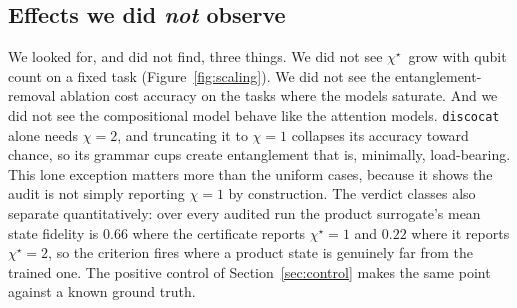 \documentclass[10pt]{article}
\newcommand{\chistar}{\ensuremath{\chi^\star}}
\begin{document}
\subsection{Effects we did \emph{not} observe}
\label{sec:results-none}
We looked for, and did not find, three things. We did not see \chistar\ grow with qubit count on a
fixed task (Figure~\ref{fig:scaling}). We did not see the entanglement-removal ablation cost accuracy
on the tasks where the models saturate. And we did not see the compositional model behave like the
attention models. \texttt{discocat} alone needs $\chi{=}2$, and truncating it to $\chi{=}1$ collapses
its accuracy toward chance, so its grammar cups create entanglement that is, minimally, load-bearing.
This lone exception matters more than the uniform cases, because it shows the audit is not simply
reporting $\chi{=}1$ by construction. The verdict classes also separate quantitatively: over every
audited run the product surrogate's mean state fidelity is $0.66$ where the certificate reports
$\chi^\star{=}1$ and $0.22$ where it reports $\chi^\star{=}2$, so the criterion fires where a
product state is genuinely far from the trained one. The positive control of
Section~\ref{sec:control} makes the same point against a known ground truth.

\begin{table}[t]
\centering
\resizebox{\linewidth}{!}{%
}
\caption{Simulability certificate for all models. Mean and standard deviation over seeds.
Acc@$\chi{=}1$ is the accuracy of a product-state surrogate; $p_{\mathrm{McN}}^{\chi=1}$ is the
mean exact-McNemar p-value comparing that surrogate against the full model, where a large value
means the two are not significantly different and a small value flags a surrogate that is
significantly worse; $d^{\chi=1}$ is the mean number of test examples on which the surrogate and
the full model disagree, which is what separates a p-value of one obtained because the two models
predict identically ($d{=}0$) from one obtained because their disagreements happen to be balanced;
\chistar\ is Eq.~\ref{eq:chistar}; $\bar S$ is the mean bipartite entanglement entropy in nats;
$\Delta A_{\mathrm{ent}}$ is the entanglement-removal gap, marked \texttt{n/a} where a separable
twin is not defined. On \textsc{mc} the attention and mixer models are recovered at $\chi{=}1$ with no
disagreements at all; on \textsc{sst2} they are recovered at $\chi{=}1$ with a handful of
disagreements out of $200$ that do not move accuracy, and \texttt{discocat} needs $\chi{=}2$.}
\label{tab:results}
\end{table}
\end{document}
